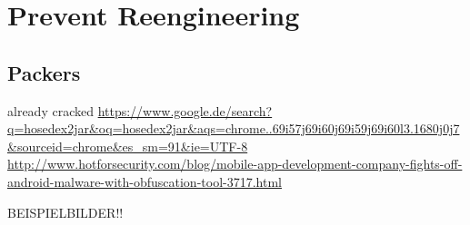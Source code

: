 \section{Prevent Reengineering} \label{section:evaluation-reengineering}


\subsection{Packers}
already cracked \url{https://www.google.de/search?q=hosedex2jar&oq=hosedex2jar&aqs=chrome..69i57j69i60j69i59j69i60l3.1680j0j7&sourceid=chrome&es_sm=91&ie=UTF-8}\newline
\url{http://www.hotforsecurity.com/blog/mobile-app-development-company-fights-off-android-malware-with-obfuscation-tool-3717.html}\newline

BEISPIELBILDER!!
